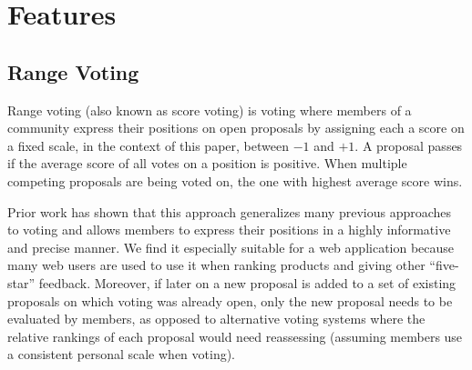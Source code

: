 \documentclass{sigchi}
\begin{document}
%
%
%
%
%

\section{Features}

\subsection{Range Voting}

Range voting (also known as score voting) is voting where members of a community express their positions on open proposals by assigning
each a score on a fixed scale, in the context of this paper, between $-1$ and $+1$.
A proposal passes if the average score of all votes on a position is positive.
When multiple competing proposals are being voted on, the one with highest average score wins.

Prior work has shown that this approach generalizes many previous approaches to voting and allows members to express their
positions in a highly informative and precise manner.
We find it especially suitable for a web application because many web users are used to use it when ranking products
and giving other ``five-star'' feedback.
Moreover, if later on a new proposal is added to a set of existing proposals on which voting was already open, only the
new proposal needs to be evaluated by members, as opposed to alternative voting systems where the relative rankings of
each proposal would need reassessing (assuming members use a consistent personal scale when voting).
\end{document}
